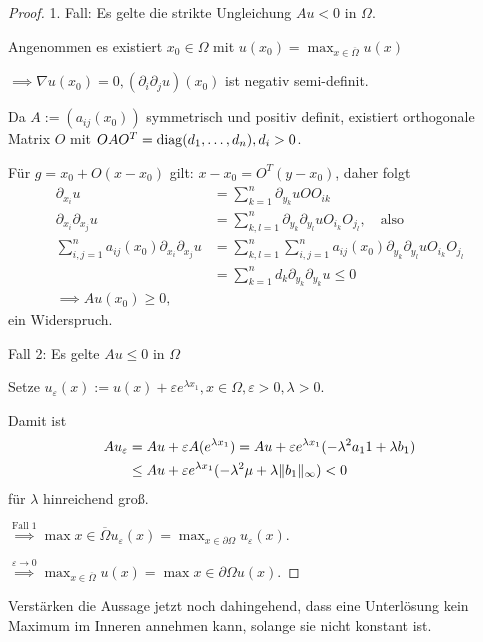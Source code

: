 \begin{proof}
  1. Fall: Es gelte die strikte Ungleichung $Au < 0$ in $\Omega$.

  Angenommen es existiert $x_0 \in \Omega$ mit $u(x_0) = \max_{x \in \overline\Omega} u(x)$

  $\implies \nabla u(x_0) = 0, (\partial_i \partial_j u)(x_0)$ ist negativ semi-definit.

  Da $A:=(a_{ij}(x_0))$ symmetrisch und positiv definit, existiert orthogonale Matrix $O$ mit $OAO^T = \operatorname{diag}(d_1,\dots,d_n), d_i > 0$.

  Für $g = x_0 + O(x - x_0)$ gilt: $x - x_0 = O^T(y - x_0)$, daher folgt
  \begin{align*}
    \partial_{x_i} u &= \sum_{k = 1}^n \partial_{y_k} uO O_{ik} \\
    \partial_{x_i} \partial_{x_j} u &= \sum_{k,l = 1}^n \partial_{y_k}\partial_{y_l} u O_{i_k} O_{j_l}, \quad\text{also}\\
    \sum_{i,j=1}^n a_{ij}(x_0) \partial_{x_i} \partial_{x_j} u &= \sum_{k,l = 1}^n \sum_{i,j = 1}^n a_{ij}(x_0) \partial_{y_k} \partial_{y_l} u O_{i_k} O_{j_l} \\
    &= \sum_{k = 1}^n d_k \partial_{y_k} \partial_{y_k} u \leq 0 \\
    \implies Au(x_0) \geq 0,
  \end{align*}
  ein Widerspruch.

  Fall 2: Es gelte $A u \leq 0$ in $\Omega$

  Setze $u_\varepsilon(x) := u(x) + \varepsilon e^{\lambda x_1}, x \in \Omega, \varepsilon > 0, \lambda > 0.$

  Damit ist 
  \begin{align*}
  A u_\varepsilon &= Au + \varepsilon A(e^{\lambda x_1}) = A u + \varepsilon e^{\lambda x_1} (-\lambda^2 a_11 + \lambda b_1) \\
  &\leq Au + \varepsilon e^{\lambda x_1} (-\lambda^2 \mu + \lambda \lVert b_1 \rVert_\infty ) < 0
  \end{align*}
  für $\lambda$ hinreichend groß.

  $\overset{\text{Fall 1}}{\implies} \max{x \in \overline\Omega} u_\varepsilon(x)  = \max_{x \in \partial\Omega} u_\varepsilon(x)$.

  $\overset{\varepsilon \to 0}{\implies} \max_{x \in \overline\Omega} u(x) = \max{x \in \partial\Omega} u(x)$.
\end{proof}

Verstärken die Aussage jetzt noch dahingehend, dass eine Unterlösung kein Maximum im Inneren annehmen kann, solange sie nicht konstant ist.

